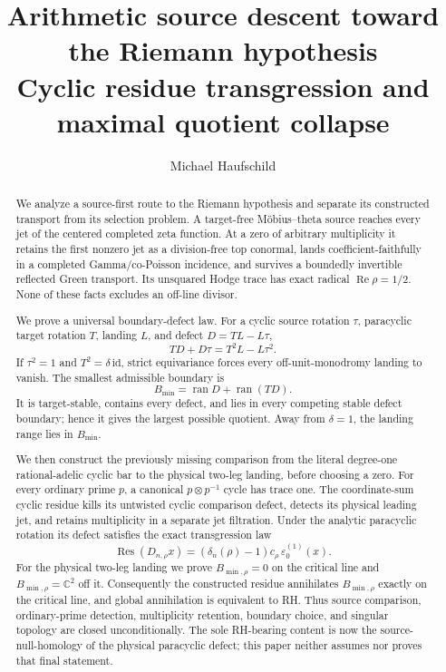 \documentclass[11pt]{article}
\title{\textbf{Arithmetic source descent toward the Riemann hypothesis}\\
\large Cyclic residue transgression and maximal quotient collapse}
\author{Michael Haufschild}
\date{}
\theoremstyle{definition}
\theoremstyle{remark}
\newcommand{\C}{\mathbb C}
\newcommand{\ran}{\operatorname{ran}}
\newcommand{\Rea}{\operatorname{Re}}
\begin{document}
\maketitle

\begin{abstract}
We analyze a source-first route to the Riemann hypothesis and separate its
constructed transport from its selection problem.  A target-free
M\"obius--theta source reaches every jet of the centered completed zeta
function.  At a zero of arbitrary multiplicity it retains the first nonzero
jet as a division-free top conormal, lands coefficient-faithfully in a
completed Gamma/co-Poisson incidence, and survives a boundedly invertible
reflected Green transport.  Its unsquared Hodge trace has exact radical
\(\Rea\rho=1/2\).  None of these facts excludes an off-line divisor.

We prove a universal boundary-defect law.  For a cyclic source rotation
\(\tau\), paracyclic target rotation \(T\), landing \(L\), and defect
\(D=TL-L\tau\),
\[
                         TD+D\tau=T^2L-L\tau^2.
\]
If \(\tau^2=1\) and \(T^2=\delta\,\mathrm{id}\), strict equivariance forces
every off-unit-monodromy landing to vanish.  The smallest admissible boundary
is
\[
                         B_{\min}=\ran D+\ran(TD).
\]
It is target-stable, contains every defect, and lies in every competing
stable defect boundary; hence it gives the largest possible quotient.  Away
from \(\delta=1\), the landing range lies in \(B_{\min}\).

We then construct the previously missing comparison from the literal
degree-one rational-adelic cyclic bar to the physical two-leg landing,
before choosing a zero.  For every ordinary prime \(p\), a canonical
\(p\otimes p^{-1}\) cycle has trace one.  The coordinate-sum cyclic residue
kills its untwisted cyclic comparison defect, detects its physical leading
jet, and retains multiplicity in a separate jet filtration.  Under the
analytic paracyclic rotation its defect satisfies the exact transgression
law
\[
 \operatorname{Res}(D_{n,\rho}x)
  =(\delta_n(\rho)-1)c_\rho\,\varepsilon_0^{(1)}(x).
\]
For the physical two-leg landing we prove
\(B_{\min,\rho}=0\) on the critical line and
\(B_{\min,\rho}=\C^2\) off it.  Consequently the constructed residue
annihilates \(B_{\min,\rho}\) exactly on the critical line, and global
annihilation is equivalent to RH.  Thus source comparison, ordinary-prime
detection, multiplicity retention, boundary choice, and singular topology
are closed unconditionally.  The sole RH-bearing content is now the
source-null-homology of the physical paracyclic defect; this paper neither
assumes nor proves that final statement.
\end{abstract}
\end{document}

